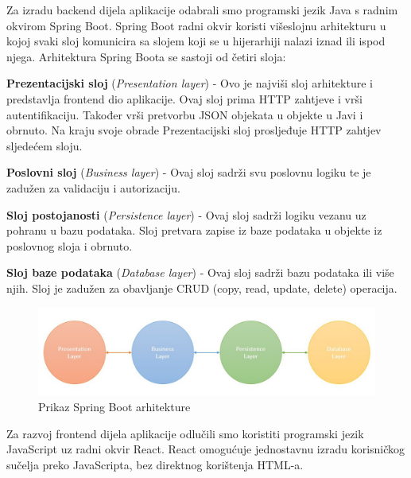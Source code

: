 		Za izradu backend dijela aplikacije odabrali smo programski jezik Java s radnim okvirom Spring Boot. Spring Boot radni okvir koristi višeslojnu arhitekturu u kojoj svaki sloj komunicira sa slojem koji se u hijerarhiji nalazi iznad ili ispod njega. Arhitektura Spring Boota se sastoji od četiri sloja:
		\begin{packed_item}
			\item \textbf{Prezentacijski sloj} (\textit{Presentation layer}) - Ovo je najviši sloj arhitekture i predstavlja frontend dio aplikacije. Ovaj sloj prima HTTP zahtjeve i vrši autentifikaciju. Također vrši pretvorbu JSON objekata u objekte u Javi i obrnuto. Na kraju svoje obrade Prezentacijski sloj prosljeđuje HTTP zahtjev sljedećem sloju.
			
			\item \textbf{Poslovni sloj} (\textit{Business layer}) - Ovaj sloj sadrži svu poslovnu logiku te je zadužen za validaciju i autorizaciju.
			
			\item \textbf{Sloj postojanosti} (\textit{Persistence layer}) - Ovaj sloj sadrži logiku vezanu uz pohranu u bazu podataka. Sloj pretvara zapise iz baze podataka u objekte iz poslovnog sloja i obrnuto.
			
			\item \textbf{Sloj baze podataka} (\textit{Database layer}) - Ovaj sloj sadrži bazu podataka ili više njih. Sloj je zadužen za obavljanje CRUD (copy, read, update, delete) operacija.
		\end{packed_item}
		
		\begin{figure}[H]
			\includegraphics[width=\textwidth]{slike/slojeviArhitekture.jpg} %
			\caption{Prikaz Spring Boot arhitekture}
			\label{fig:MVC1} %
		\end{figure}
		
		Za razvoj frontend dijela aplikacije odlučili smo koristiti programski jezik JavaScript uz radni okvir React. React omogućuje jednostavnu izradu korisničkog sučelja preko JavaScripta, bez direktnog korištenja HTML-a.
		

